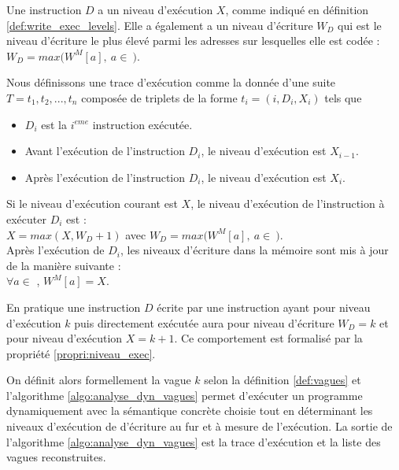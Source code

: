 Une instruction $D$ a un niveau d'exécution $X$, comme indiqué en définition \ref{def:write_exec_levels}.
Elle a également a un niveau d'écriture $W_D$ qui est le niveau d'écriture le plus élevé parmi les adresses sur lesquelles elle est codée : $W_D=max(W^M[a],\ a\in\ $$)$.


\begin{defi}
Nous définissons une trace d'exécution comme la donnée d'une suite $T=t_1, t_2, ..., t_n$ composée de triplets de la forme $t_i=(i, D_i, X_i)$ tels que
\begin{itemize}
 \item $D_i$ est la $i^{eme}$ instruction exécutée.
 \item Avant l'exécution de l'instruction $D_i$, le niveau d'exécution est \texttt{$X_{i-1}$}.
 \item Après l'exécution de l'instruction $D_i$, le niveau d'exécution est \texttt{$X_i$}.
\end{itemize}
\label{def:write_exec_levels}
\end{defi}

\begin{propri}
 Si le niveau d'exécution courant est $X$, le niveau d'exécution de l'instruction à exécuter $D_i$ est :\\
 $X=max(X, W_D+1)$ avec $W_D=max(W^M[a],\ a\in\ $$)$.\\
 Après l'exécution de $D_i$, les niveaux d'écriture dans la mémoire sont mis à jour de la manière suivante :\\
 $\forall a\in$ , $W^M[a]=X$.
\label{propri:niveau_exec}
\end{propri}

En pratique une instruction $D$ écrite par une instruction ayant pour niveau d'exécution $k$ puis directement exécutée aura pour niveau d'écriture $W_D=k$ et pour niveau d'exécution $X=k+1$. Ce comportement est formalisé par la propriété \ref{propri:niveau_exec}.

On définit alors formellement la vague $k$ selon la définition \ref{def:vagues} et l'algorithme \ref{algo:analyse_dyn_vagues} permet d'exécuter un programme dynamiquement avec la sémantique concrète choisie tout en déterminant les niveaux d'exécution de d'écriture au fur et à mesure de l'exécution. La sortie de l'algorithme \ref{algo:analyse_dyn_vagues} est la trace d'exécution et la liste des vagues reconstruites.
\\

